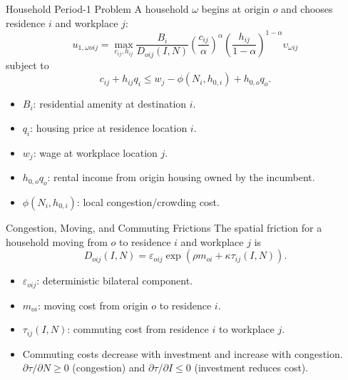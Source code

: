 \documentclass[10pt]{beamer}
\begin{document}
\begin{frame}{Household Period-1 Problem}
A household $\omega$ begins at origin $o$ and chooses residence $i$ and workplace $j$:
\[
u_{1,\omega oij}
=
\max_{c_{ij},h_{ij}}
\frac{B_i}{D_{oij}(I,N)}
\left(\frac{c_{ij}}{\alpha}\right)^{\alpha}
\left(\frac{h_{ij}}{1-\alpha}\right)^{1-\alpha}
\upsilon_{\omega ij}
\]
subject to
\[
c_{ij}+h_{ij}q_i
\leq
w_j-\phi(N_i,h_{0,i})+h_{0,o}q_o .
\]

\vspace{0.2cm}
\begin{itemize}
    \item $B_i$: residential amenity at destination $i$.
    \item $q_i$: housing price at residence location $i$.
    \item $w_j$: wage at workplace location $j$.
    \item $h_{0,o}q_o$: rental income from origin housing owned by the incumbent.
    \item $\phi(N_i,h_{0,i})$: local congestion/crowding cost.
\end{itemize}
\end{frame}

\begin{frame}{Congestion, Moving, and Commuting Frictions}
The spatial friction for a household moving from $o$ to residence $i$ and workplace $j$ is
\[
D_{oij}(I,N)
=
\varepsilon_{oij}
\exp\!\left(
\rho m_{oi}+\kappa \tau_{ij}(I,N)
\right).
\]

\vspace{0.25cm}
\begin{itemize}
    \item $\varepsilon_{oij}$: deterministic bilateral component.
    \item $m_{oi}$: moving cost from origin $o$ to residence $i$.
    \item $\tau_{ij}(I,N)$: commuting cost from residence $i$ to workplace $j$.
    \item Commuting costs decrease with investment and increase with congestion. $\partial\tau/\partial N \geq 0$ (congestion) and $\partial\tau/\partial I \leq 0$ (investment reduces cost).
\end{itemize}

\vspace{0.2cm}


\end{frame}
\end{document}
